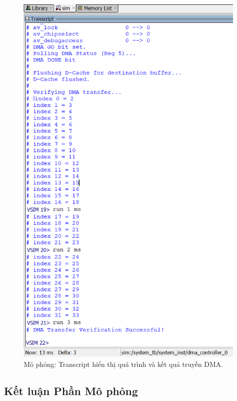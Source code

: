 \begin{figure}[htbp]
    \centering
    \includegraphics[width=0.7\linewidth]{Images/04_07_TranscriptSimulationOutput.png} %
    \caption{Mô phỏng: Transcript hiển thị quá trình và kết quả truyền DMA.}
    \label{fig:04_07_TranscriptSimulationOutput}
\end{figure}

\FloatBarrier %

\subsection{Kết luận Phần Mô phỏng} %
\label{sec:chapter4_conclusion} %

